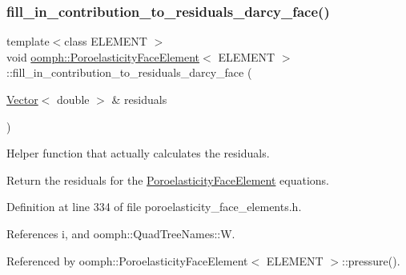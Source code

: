 \subsubsection{\texorpdfstring{fill\+\_\+in\+\_\+contribution\+\_\+to\+\_\+residuals\+\_\+darcy\+\_\+face()}{fill\_in\_contribution\_to\_residuals\_darcy\_face()}}
{\footnotesize\ttfamily template$<$class E\+L\+E\+M\+E\+NT $>$ \\
void \hyperlink{classoomph_1_1PoroelasticityFaceElement}{oomph\+::\+Poroelasticity\+Face\+Element}$<$ E\+L\+E\+M\+E\+NT $>$\+::fill\+\_\+in\+\_\+contribution\+\_\+to\+\_\+residuals\+\_\+darcy\+\_\+face (\begin{DoxyParamCaption}\item[{\hyperlink{classoomph_1_1Vector}{Vector}$<$ double $>$ \&}]{residuals }\end{DoxyParamCaption})\hspace{0.3cm}{\ttfamily [protected]}}



Helper function that actually calculates the residuals. 

Return the residuals for the \hyperlink{classoomph_1_1PoroelasticityFaceElement}{Poroelasticity\+Face\+Element} equations. 

Definition at line 334 of file poroelasticity\+\_\+face\+\_\+elements.\+h.



References i, and oomph\+::\+Quad\+Tree\+Names\+::W.



Referenced by oomph\+::\+Poroelasticity\+Face\+Element$<$ E\+L\+E\+M\+E\+N\+T $>$\+::pressure().

\mbox{\label{classoomph_1_1PoroelasticityFaceElement_adac5f074dfe38b1aa402601507f940b4}} 
